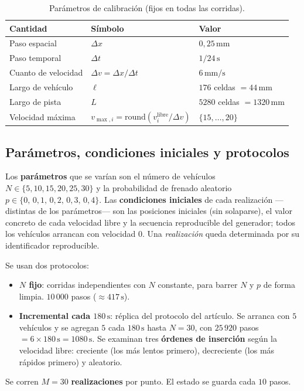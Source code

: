 \documentclass[11pt,a4paper]{article}
\newcommand{\unit}[1]{\,\mathrm{#1}}
\begin{document}
\begin{table}[h]\centering
\caption{Parámetros de calibración (fijos en todas las corridas).}
\label{tab:calib}
\begin{tabular}{lll}
\toprule
Cantidad & Símbolo & Valor \\
\midrule
Paso espacial & $\Delta x$ & $0{,}25\unit{mm}$ \\
Paso temporal & $\Delta t$ & $1/24\unit{s}$ \\
Cuanto de velocidad & $\Delta v=\Delta x/\Delta t$ & $6\unit{mm/s}$ \\
Largo de vehículo & $\ell$ & $176$ celdas $=44\unit{mm}$ \\
Largo de pista & $L$ & $5280$ celdas $=1320\unit{mm}$ \\
Velocidad máxima & $v_{\max,i}=\mathrm{round}(v^{\mathrm{libre}}_i/\Delta v)$ & $\{15,\dots,20\}$ \\
\bottomrule
\end{tabular}
\end{table}

\subsection{Parámetros, condiciones iniciales y protocolos}

Los \textbf{parámetros} que se varían son el número de vehículos
$N\in\{5,10,15,20,25,30\}$ y la probabilidad de frenado aleatorio
$p\in\{0,\,0{,}1,\,0{,}2,\,0{,}3,\,0{,}4\}$. Las \textbf{condiciones iniciales} de
cada realización —distintas de los parámetros— son las posiciones iniciales (sin
solaparse), el valor concreto de cada velocidad libre y la secuencia reproducible del
generador; todos los vehículos arrancan con velocidad $0$. Una \emph{realización} queda
determinada por su identificador reproducible.

Se usan dos protocolos:
\begin{itemize}
  \item \textbf{$N$ fijo}: corridas independientes con $N$ constante, para barrer
  $N$ y $p$ de forma limpia. $10\,000$ pasos ($\approx417\unit{s}$).
  \item \textbf{Incremental cada $180\unit{s}$}: réplica del protocolo del artículo.
  Se arranca con $5$ vehículos y se agregan $5$ cada $180\unit{s}$ hasta $N=30$, con
  $25\,920$ pasos $=6\times180\unit{s}=1080\unit{s}$. Se examinan tres
  \textbf{órdenes de inserción} según la velocidad libre: creciente
  (los más lentos primero), decreciente (los más rápidos primero) y aleatorio.
\end{itemize}
Se corren $M=30$ \textbf{realizaciones} por punto. El estado se guarda cada $10$ pasos.
\end{document}
